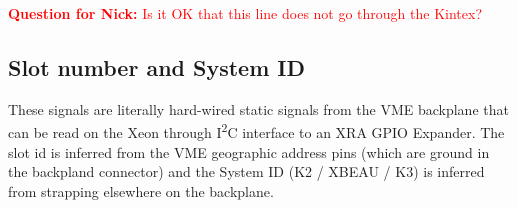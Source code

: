 \documentclass[12pt]{article}
\begin{document}
\textcolor{red}{\textbf{Question for Nick:} Is it OK that this line does not go through the Kintex?}



\subsection{Slot number and System ID}
\label{section:slot_system_id}

These signals are literally hard-wired static signals from the VME backplane that can be read on the Xeon through I\textsuperscript{2}C interface to an XRA GPIO Expander.  The slot id is inferred from the VME geographic address pins (which are ground in the backpland connector) and the System ID (K2 / XBEAU / K3) is inferred from strapping elsewhere on the backplane.
\end{document}

